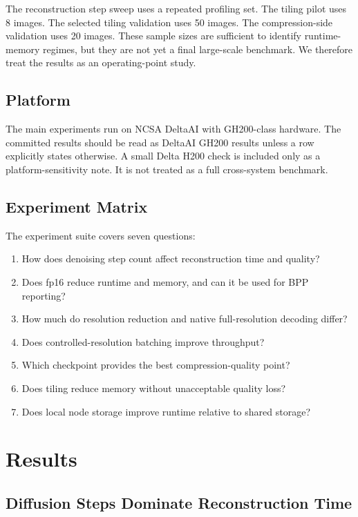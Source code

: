\documentclass[conference]{IEEEtran}
\begin{document}
The reconstruction step sweep uses a repeated profiling set. The tiling pilot uses 8 images. The selected tiling validation uses 50 images. The compression-side validation uses 20 images. These sample sizes are sufficient to identify runtime-memory regimes, but they are not yet a final large-scale benchmark. We therefore treat the results as an operating-point study.

\subsection{Platform}

The main experiments run on NCSA DeltaAI with GH200-class hardware. The committed results should be read as DeltaAI GH200 results unless a row explicitly states otherwise. A small Delta H200 check is included only as a platform-sensitivity note. It is not treated as a full cross-system benchmark.

\subsection{Experiment Matrix}

The experiment suite covers seven questions:
\begin{enumerate}
\item How does denoising step count affect reconstruction time and quality?
\item Does fp16 reduce runtime and memory, and can it be used for BPP reporting?
\item How much do resolution reduction and native full-resolution decoding differ?
\item Does controlled-resolution batching improve throughput?
\item Which checkpoint provides the best compression-quality point?
\item Does tiling reduce memory without unacceptable quality loss?
\item Does local node storage improve runtime relative to shared storage?
\end{enumerate}

\section{Results}

\subsection{Diffusion Steps Dominate Reconstruction Time}
\end{document}
